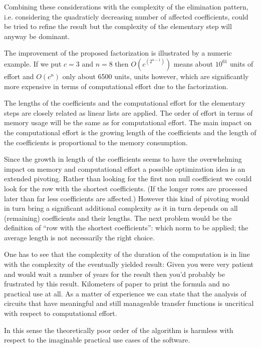 Combining these considerations with the complexity of the elimination
pattern, i.e. considering the quadraticly decreasing number of affected
coefficients, could be tried to refine the result but the complexity of
the elementary step will anyway be dominant.

The improvement of the proposed factorization is illustrated by a numeric
example. If we put $c=3$ and $n=8$ then $O(c^{(2^{n-1})})$ means about
$10^{61}$ units of effort and $O(c^n)$ only about 6500 units, units
however, which are significantly more expensive in terms of computational
effort due to the factorization.

The lengths of the coefficients and the computational effort for the
elementary steps are closely related as linear lists are applied. The
order of effort in terms of memory usage will be the same as for
computational effort. The main impact on the computational effort is the
growing length of the coefficients and the length of the coefficients is
proportional to the memory consumption.

Since the growth in length of the coefficients seems to have the
overwhelming impact on memory and computational effort a possible
optimization idea is an extended pivoting. Rather than looking for the
first non null coefficient we could look for the row with the shortest
coefficients. (If the longer rows are processed later than far less
coefficients are affected.) However this kind of pivoting would in turn
bring a significant additional complexity as it in turn depends on all
(remaining) coefficients and their lengths. The next problem would be the
definition of ``row with the shortest coefficients'': which norm to be
applied; the average length is not necessarily the right choice.

One has to see that the complexity of the duration of the computation is
in line with the complexity of the eventually yielded result: Given you
were very patient and would wait a number of years for the result
then you'd probably be frustrated by this result. Kilometers of paper to
print the formula and no practical use at all. As a matter of experience
we can state that the analysis of circuits that have meaningful and still
manageable transfer functions is uncritical with respect to computational
effort.

In this sense the theoretically poor order of the algorithm is harmless
with respect to the imaginable practical use cases of the software.


